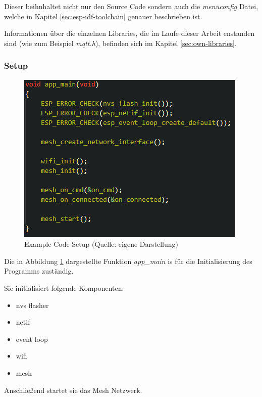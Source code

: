 Dieser beihnhaltet nicht nur den Source Code sondern auch die \textit{menuconfig} Datei, welche in Kapitel \ref{sec:esp-idf-toolchain} genauer beschrieben ist.

Informationen über die einzelnen Libraries, die im Laufe dieser Arbeit enstanden sind (wie zum Beispiel \textit{mqtt.h}), befinden sich im Kapitel \ref{sec:own-libraries}.

\subsubsection{Setup}

\begin{figure}[H]
    \begin{center}
        \includegraphics[scale=0.8]{images/example_code_setup.png}
        \caption{Example Code Setup (Quelle: eigene Darstellung)}
        \label{abb:example_code_setup}
    \end{center}
\end{figure}

Die in Abbildung \ref{abb:example_code_setup} dargestellte Funktion \textit{app\_main} is für die Initialisierung des Programms zuständig.

Sie initialisiert folgende Komponenten:

\begin{itemize}
    \item nvs flasher
    \item netif
    \item event loop
    \item wifi
    \item mesh
\end{itemize}

Anschließend startet sie das Mesh Netzwerk.

